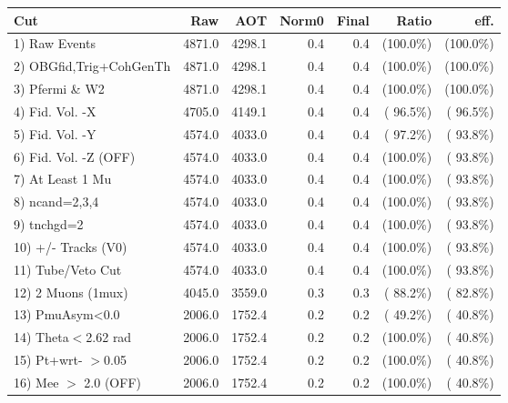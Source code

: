  \begin{table}[h!]\centering
 \begin{tabular}{||l||r|r|r|r|r|r||}
 \hline
 \hline
 Cut & Raw & AOT & Norm0 & Final & Ratio & eff.       \\
 \hline
  1) Raw Events           &       4871.0 &       4298.1 &          0.4 &          0.4 & (100.0\%) & (100.0\%) \\
  2) OBGfid,Trig+CohGenTh &       4871.0 &       4298.1 &          0.4 &          0.4 & (100.0\%) & (100.0\%) \\
  3) Pfermi \& W2         &       4871.0 &       4298.1 &          0.4 &          0.4 & (100.0\%) & (100.0\%) \\
  4) Fid. Vol. -X         &       4705.0 &       4149.1 &          0.4 &          0.4 & ( 96.5\%) & ( 96.5\%) \\
  5) Fid. Vol. -Y         &       4574.0 &       4033.0 &          0.4 &          0.4 & ( 97.2\%) & ( 93.8\%) \\
  6) Fid. Vol. -Z (OFF)   &       4574.0 &       4033.0 &          0.4 &          0.4 & (100.0\%) & ( 93.8\%) \\
  7) At Least 1 Mu        &       4574.0 &       4033.0 &          0.4 &          0.4 & (100.0\%) & ( 93.8\%) \\
  8) ncand=2,3,4          &       4574.0 &       4033.0 &          0.4 &          0.4 & (100.0\%) & ( 93.8\%) \\
  9) tnchgd=2             &       4574.0 &       4033.0 &          0.4 &          0.4 & (100.0\%) & ( 93.8\%) \\
 10) +/- Tracks (V0)      &       4574.0 &       4033.0 &          0.4 &          0.4 & (100.0\%) & ( 93.8\%) \\
 11) Tube/Veto Cut        &       4574.0 &       4033.0 &          0.4 &          0.4 & (100.0\%) & ( 93.8\%) \\
 12) 2 Muons (1mux)       &       4045.0 &       3559.0 &          0.3 &          0.3 & ( 88.2\%) & ( 82.8\%) \\
 13) PmuAsym<0.0          &       2006.0 &       1752.4 &          0.2 &          0.2 & ( 49.2\%) & ( 40.8\%) \\
 14) Theta$<$2.62 rad     &       2006.0 &       1752.4 &          0.2 &          0.2 & (100.0\%) & ( 40.8\%) \\
 15) Pt+wrt- $>$0.05      &       2006.0 &       1752.4 &          0.2 &          0.2 & (100.0\%) & ( 40.8\%) \\
 16) Mee $>$ 2.0  (OFF)   &       2006.0 &       1752.4 &          0.2 &          0.2 & (100.0\%) & ( 40.8\%) \\

\end{tabular}
\end{table}
